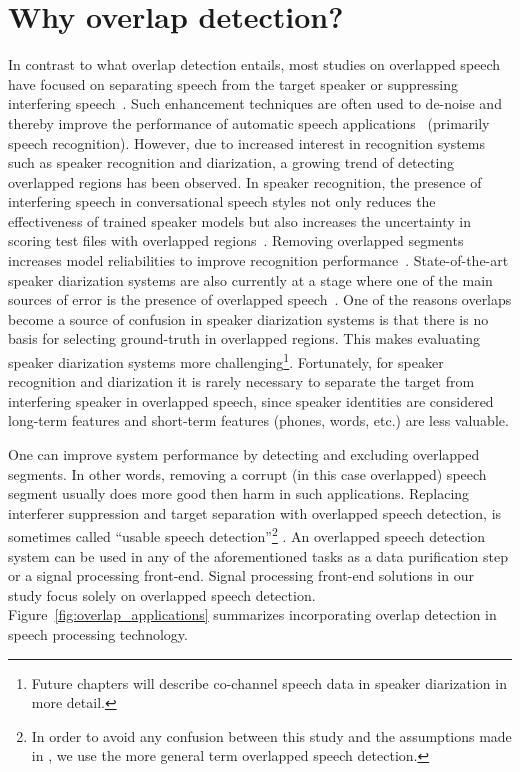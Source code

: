 \section{Why overlap detection?}
\label{sec:ch2_Background}
In contrast to what overlap detection entails, most studies on overlapped speech have focused on separating speech from the target speaker or suppressing interfering speech~\cite{morgan_cochannel}. 
Such enhancement techniques are often used to de-noise and thereby improve the performance of automatic speech applications~\cite{Quat_Dan_cch_sup,Chazan_93,cooke20101} (primarily speech recognition). 
However, due to increased interest in recognition systems such as speaker recognition and diarization, a growing trend of detecting overlapped regions has been observed. 
In speaker recognition, the presence of interfering speech in conversational speech styles not only reduces the effectiveness of trained speaker models but also increases the uncertainty in scoring test files with overlapped regions~\cite{yantorno_report}. 
Removing overlapped segments increases model reliabilities to improve recognition performance~\cite{shokouhi2015}.    
State-of-the-art speaker diarization systems are also currently at a stage where one of the main sources of error is the presence of overlapped speech~\cite{Boakye_icassp_08,zelenak12Trans}. 
One of the reasons overlaps become a source of confusion in speaker diarization systems is that there is no basis for selecting ground-truth in overlapped regions. 
This makes evaluating speaker diarization systems more challenging\footnote{Future chapters will describe co-channel speech data in speaker diarization in more detail.}. 
Fortunately, for speaker recognition and diarization it is rarely necessary to separate the target from interfering speaker in overlapped speech, since speaker identities are considered long-term features and short-term features (phones, words, etc.) are less valuable. 

One can improve system performance by detecting and excluding overlapped segments. 
In other words, removing a corrupt (in this case overlapped) speech segment usually does more good then harm in such applications. Replacing interferer suppression and target separation with overlapped speech detection, is sometimes called ``usable speech detection''\footnote{In order to avoid any confusion between this study and the assumptions made in \cite{yantorno_report}, we use the more general term overlapped speech detection.} \cite{yantorno_report}. 
An overlapped speech detection system can be used in any of the aforementioned tasks as a data purification step or a signal processing front-end. 
Signal processing front-end solutions in our study focus solely on overlapped speech detection. 
Figure~\ref{fig:overlap_applications} summarizes incorporating overlap detection in speech processing technology. 



